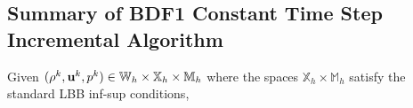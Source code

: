 \documentclass[letterpaper]{erdc}
\begin{document}
%


%
%
\subsection{Summary of BDF1 Constant Time Step Incremental Algorithm}
\label{subsec:BDF1constantTimeSummary}
Given
$(\rho^{k}, \textbf{u}^{k}, p^{k})\in \mathbb{W}_h\times \mathbb{X}_h\times
\mathbb{M}_h$
where the spaces $\mathbb{X}_h\times \mathbb{M}_h$ satisfy the standard LBB
inf-sup conditions,
\end{document}
